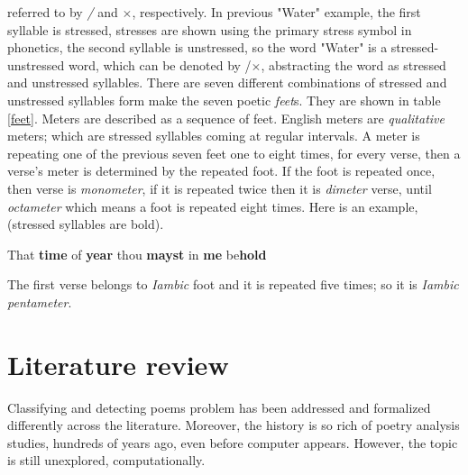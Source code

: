\documentclass[12pt]{report}
\begin{document}
referred to by \textit{/} and $\times$, respectively. In previous "Water" example, the
first syllable is stressed, stresses are shown using the primary stress symbol
 in phonetics, the second syllable is unstressed, so
the word "Water" is a  stressed-unstressed word, which can be denoted by
/$\times$, abstracting the word as stressed and unstressed syllables.
There are seven different combinations of stressed and unstressed syllables form
make the seven poetic \textit{feet}s.  They are shown in table \ref{feet}.
Meters are described as a sequence of feet. English meters are \textit{qualitative}
meters; which are stressed syllables coming at regular intervals.
A meter is repeating one of the previous seven feet one to eight times,
for every verse, then a verse's meter is determined by the repeated foot.
If the foot is repeated once, then verse is \textit{monometer}, if it is
repeated twice  then it is \textit{dimeter} verse, until \textit{octameter} which means
a foot is repeated eight times.  Here is an example, (stressed syllables are bold).
\begin{center}
 That \textbf{time} of \textbf{year} thou \textbf{mayst}  in \textbf{me}
be\textbf{hold}
\end{center}
The first verse belongs to \textit{Iambic} foot and it is repeated five times; so
it is \textit{Iambic pentameter}.





\section{Literature review}


Classifying and detecting poems problem has been addressed and formalized
differently across the literature. Moreover, the history is so rich of poetry
analysis studies, hundreds of years ago, even before computer appears. However,
the topic is still unexplored, computationally. 
\end{document}
